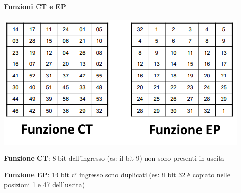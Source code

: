 \documentclass[10pt]{book}
\begin{document}
\paragraph{Funzioni CT e EP}
\begin{center}
	\includegraphics[scale=0.75]{11.png}
\end{center}
\begin{list}{}{}
	\item \textbf{Funzione CT}: 8 bit dell'ingresso (es: il bit 9) non sono presenti in uscita
	\item \textbf{Funzione EP}: 16 bit di ingresso sono duplicati (es: il bit 32 è copiato nelle posizioni 1 e 47 dell'uscita)
\end{list}
\end{document}
